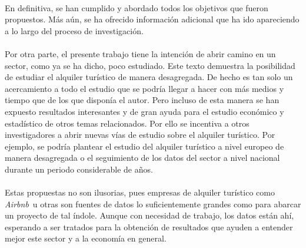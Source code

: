 \documentclass[a4paper,10pt]{article}
\newcommand*{\airbnb}{\textit{Airbnb}}
\begin{document}
\begin{multicols}{2}
        \paragraph*{}
        En definitiva, se han cumplido y abordado todos los objetivos que fueron propuestos. Más aún, se ha ofrecido información adicional que ha 
        ido apareciendo a lo largo del proceso de investigación. 
     
        \paragraph*{}
        Por otra parte, el presente trabajo tiene la intención de abrir camino en un sector,
        como ya se ha dicho, poco estudiado. Este texto demuestra la posibilidad de estudiar el alquiler turístico de manera desagregada. De hecho es
        tan solo un acercamiento a todo el estudio que se podría llegar a hacer con más medios y tiempo que de los que disponía el autor. Pero incluso 
        de esta manera se han expuesto resultados interesantes y de gran ayuda para el estudio económico y estadístico de otros temas relacionados.
        Por ello se incentiva a otros investigadores a abrir nuevas vías de estudio sobre el alquiler turístico. Por ejemplo, se podría 
        plantear el estudio del alquiler turístico a nivel europeo de manera desagregada o el seguimiento de los datos del sector a nivel nacional durante 
        un periodo considerable de años. 

        \paragraph*{}
        Estas propuestas no son ilusorias, pues empresas de alquiler turístico como \airbnb \ u otras son fuentes de datos lo suficientemente grandes
        como para abarcar un proyecto de tal índole. Aunque con necesidad de trabajo, los datos están ahí, esperando a ser tratados para la obtención de 
        resultados que ayuden a entender mejor este sector y a la economía en general.

    \end{multicols}
    \setlength{\columnsep}{10pt}

    \clearpage
\end{document}
